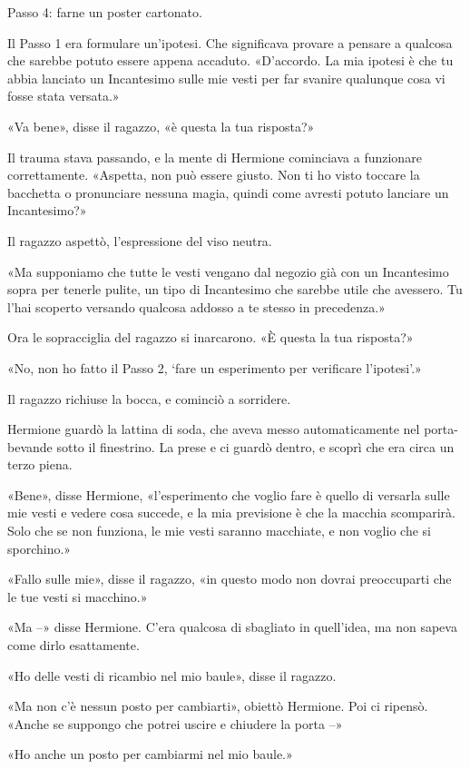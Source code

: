 Passo 4: farne un poster cartonato.

Il Passo 1 era formulare un’ipotesi. Che significava provare a pensare a qualcosa che sarebbe potuto essere appena accaduto. «D’accordo. La mia ipotesi è che tu abbia lanciato un Incantesimo sulle mie vesti per far svanire qualunque cosa vi fosse stata versata.»

«Va bene», disse il ragazzo, «è questa la tua risposta?»

Il trauma stava passando, e la mente di Hermione cominciava a funzionare correttamente. «Aspetta, non può essere giusto. Non ti ho visto toccare la bacchetta o pronunciare nessuna magia, quindi come avresti potuto lanciare un Incantesimo?»

Il ragazzo aspettò, l’espressione del viso neutra.

«Ma supponiamo che tutte le vesti vengano dal negozio già con un Incantesimo sopra per tenerle pulite, un tipo di Incantesimo che sarebbe utile che avessero. Tu l’hai scoperto versando qualcosa addosso a te stesso in precedenza.»

Ora le sopracciglia del ragazzo si inarcarono. «È questa la tua risposta?»

«No, non ho fatto il Passo 2, ‘fare un esperimento per verificare l’ipotesi’.»

Il ragazzo richiuse la bocca, e cominciò a sorridere.

Hermione guardò la lattina di soda, che aveva messo automaticamente nel porta-bevande sotto il finestrino. La prese e ci guardò dentro, e scoprì che era circa un terzo piena.

«Bene», disse Hermione, «l’esperimento che voglio fare è quello di versarla sulle mie vesti e vedere cosa succede, e la mia previsione è che la macchia scomparirà. Solo che se non funziona, le mie vesti saranno macchiate, e non voglio che si sporchino.»

«Fallo sulle mie», disse il ragazzo, «in questo modo non dovrai preoccuparti che le tue vesti si macchino.»

«Ma –» disse Hermione. C’era qualcosa di sbagliato in quell’idea, ma non sapeva come dirlo esattamente.

«Ho delle vesti di ricambio nel mio baule», disse il ragazzo.

«Ma non c’è nessun posto per cambiarti», obiettò Hermione. Poi ci ripensò. «Anche se suppongo che potrei uscire e chiudere la porta –»

«Ho anche un posto per cambiarmi nel mio baule.»

